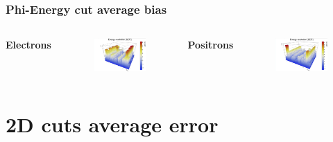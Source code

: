 \documentclass{beamer}
\begin{document}
		\begin{frame}
			\frametitle{Phi-Energy cut average bias}
			\begin{columns}
				\centering
				\Large \textbf{Electrons}
				\begin{figure}
					\centering
					\includegraphics[width = 0.95 \linewidth]{../images/c_e_phi_energy.png}
				\end{figure}
				\centering
				\Large \textbf{Positrons}
				\begin{figure}
					\centering
					\includegraphics[width = 0.95 \linewidth]{../images/c_p_phi_energy.png}
				\end{figure}
			\end{columns}
		\end{frame}
	
	\section{2D cuts average error}
	
\end{document}
